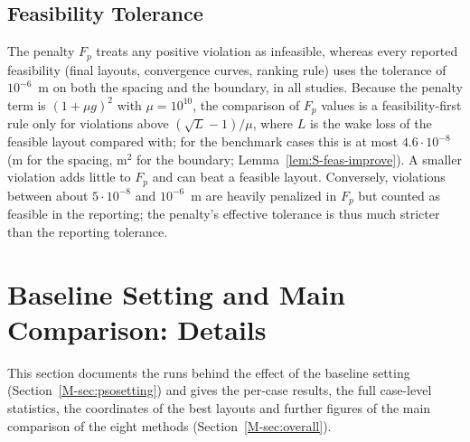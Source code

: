 \documentclass[10pt]{article}
\begin{document}
\subsection{Feasibility Tolerance}
\label{sec:S-tol}
The penalty $F_p$ treats any positive violation as infeasible, whereas every reported feasibility (final layouts, convergence curves, ranking rule) uses the tolerance of $10^{-6}$~m on both the spacing and the boundary, in all studies. Because the penalty term is $(1+\mu g)^2$ with $\mu=10^{10}$, the comparison of $F_p$ values is a feasibility-first rule only for violations above $(\sqrt{L}-1)/\mu$, where $L$ is the wake loss of the feasible layout compared with; for the benchmark cases this is at most $4.6\cdot10^{-8}$ (m for the spacing, m$^2$ for the boundary; Lemma~\ref{lem:S-feas-improve}). A smaller violation adds little to $F_p$ and can beat a feasible layout. Conversely, violations between about $5\cdot10^{-8}$ and $10^{-6}$~m are heavily penalized in $F_p$ but counted as feasible in the reporting; the penalty's effective tolerance is thus much stricter than the reporting tolerance. %

\section{Baseline Setting and Main Comparison: Details}
\label{sec:S-tables}
This section documents the runs behind the effect of the baseline setting (Section~\ref{M-sec:psosetting}) and gives the per-case results, the full case-level statistics, the coordinates of the best layouts and further figures of the main comparison of the eight methods (Section~\ref{M-sec:overall}).
\end{document}
